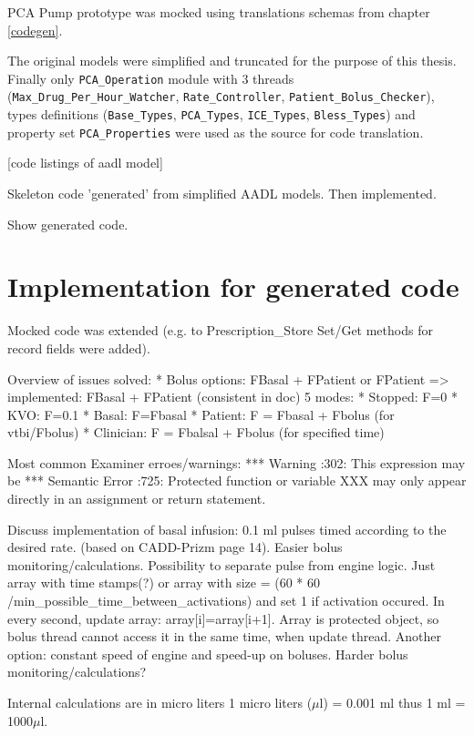 PCA Pump prototype was mocked using translations schemas from chapter \ref{codegen}.

The original models were simplified and truncated for the purpose of this thesis. Finally only \lstinline{PCA_Operation} module with 3 threads (\lstinline{Max_Drug_Per_Hour_Watcher}, \lstinline{Rate_Controller}, \lstinline{Patient_Bolus_Checker}), types definitions (\lstinline{Base_Types}, \lstinline{PCA_Types}, \lstinline{ICE_Types}, \lstinline{Bless_Types}) and property set \lstinline{PCA_Properties} were used as the source for code translation.

[code listings of aadl model]


Skeleton code 'generated' from simplified AADL models. Then implemented.

Show generated code.



\section{Implementation for generated code}
\label{pcapumpimpl:codegenimpl}

Mocked code was extended (e.g. to Prescription\_Store Set/Get methods for record fields were added).

Overview of issues solved: 
* Bolus options: FBasal + FPatient or FPatient => implemented: FBasal + FPatient (consistent in doc)
5 modes:
* Stopped: F=0
* KVO: F=0.1
* Basal: F=Fbasal
* Patient: F = Fbasal + Fbolus (for vtbi/Fbolus)
* Clinician: F = Fbalsal + Fbolus (for specified time)

Most common Examiner\cite{Examiner:Online} erroes/warnings:
***        Warning                     :302: This expression may be
***        Semantic Error              :725: Protected function or variable XXX may only appear directly in an assignment or return statement.

Discuss implementation of basal infusion: 0.1 ml pulses timed according to the desired rate. (based on CADD-Prizm page 14). Easier bolus monitoring/calculations. Possibility to separate pulse from engine logic. Just array with time stamps(?) or array with size = (60 * 60 /min\_possible\_time\_between\_activations) and set 1 if activation occured. In every second, update array: array[i]=array[i+1]. Array is protected object, so bolus thread cannot access it in the same time, when update thread.
Another option: constant speed of engine and speed-up on boluses. Harder bolus monitoring/calculations?


Internal calculations are in micro liters 1 micro liters ($\mu$l) = 0.001 ml thus 1 ml = 1000$\mu$l.


